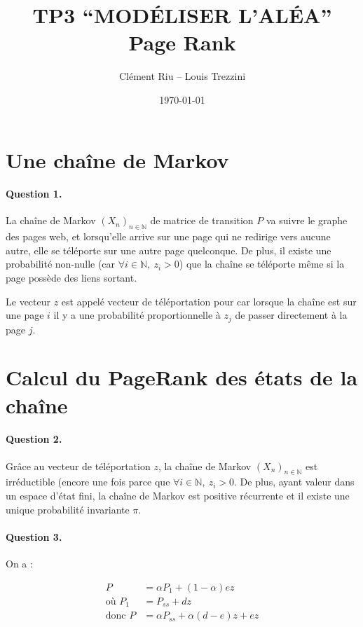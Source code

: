 \documentclass[12pt,a4paper]{article}
\title{\textbf{TP3 “MODÉLISER L’ALÉA” \\ Page Rank}}
\author{Clément Riu -- Louis Trezzini}
\date{\today}
\newcommand{\N}{\mathbb{N}}
\begin{document}
\maketitle

\section{Une chaîne de Markov}

\paragraph*{Question 1.} La chaîne de Markov $(X_n)_{n \in \N}$ de matrice de transition $P$ va suivre le graphe des pages web, et lorsqu'elle arrive sur une page qui ne redirige vers aucune autre, elle se téléporte sur une autre page quelconque. De plus, il existe une probabilité non-nulle (car $\forall i \in \N, \ z_i > 0$) que la chaîne se téléporte même si la page possède des liens sortant.

Le vecteur $z$ est appelé vecteur de téléportation pour car lorsque la chaîne est sur une page $i$ il y a une probabilité proportionnelle à $z_j$ de passer directement à la page $j$.

\section{Calcul du PageRank des états de la chaîne}

\paragraph*{Question 2.} Grâce au vecteur de téléportation $z$, la chaîne de Markov $(X_n)_{n \in \N}$ est irréductible (encore une fois parce que $\forall i \in \N, \ z_i > 0$. De plus, ayant valeur dans un espace d'état fini, la chaîne de Markov est positive récurrente et il existe une unique probabilité invariante $\pi$.

\paragraph*{Question 3.} On a :

\begin{align*}
	P &= \alpha P_1 + (1 - \alpha) e z \\
	\text{o\`u } P_1 &= P_{ss} + dz \\
	\text{donc } P &= \alpha P_{ss} + \alpha (d - e) z + e z
\end{align*}
\end{document}
